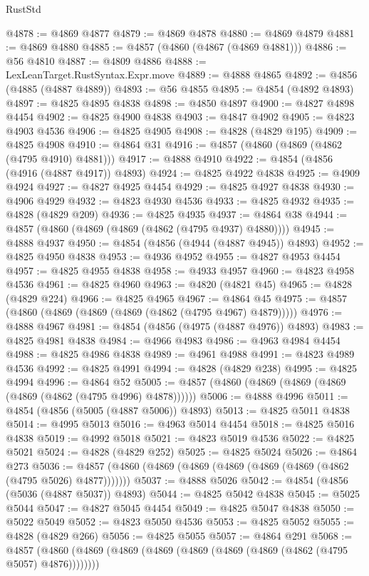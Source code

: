 \begin{lexlean}{RustStd}
\begin{coremodule}
@4878 := @4869 @4877
@4879 := @4869 @4878
@4880 := @4869 @4879
@4881 := @4869 @4880
@4885 := @4857 (@4860 (@4867 (@4869 @4881)))
@4886 := @56 @4810
@4887 := @4809 @4886
@4888 := LexLeanTarget.RustSyntax.Expr.move
@4889 := @4888 @4865
@4892 := @4856 (@4885 (@4887 @4889))
@4893 := @56 @4855
@4895 := @4854 (@4892 @4893)
@4897 := @4825 @4895 @4838
@4898 := @4850 @4897
@4900 := @4827 @4898 @4454
@4902 := @4825 @4900 @4838
@4903 := @4847 @4902
@4905 := @4823 @4903 @4536
@4906 := @4825 @4905
@4908 := @4828 (@4829 @195)
@4909 := @4825 @4908
@4910 := @4864 @31
@4916 := @4857 (@4860 (@4869 (@4862 (@4795 @4910) @4881)))
@4917 := @4888 @4910
@4922 := @4854 (@4856 (@4916 (@4887 @4917)) @4893)
@4924 := @4825 @4922 @4838
@4925 := @4909 @4924
@4927 := @4827 @4925 @4454
@4929 := @4825 @4927 @4838
@4930 := @4906 @4929
@4932 := @4823 @4930 @4536
@4933 := @4825 @4932
@4935 := @4828 (@4829 @209)
@4936 := @4825 @4935
@4937 := @4864 @38
@4944 := @4857 (@4860 (@4869 (@4869 (@4862 (@4795 @4937) @4880))))
@4945 := @4888 @4937
@4950 := @4854 (@4856 (@4944 (@4887 @4945)) @4893)
@4952 := @4825 @4950 @4838
@4953 := @4936 @4952
@4955 := @4827 @4953 @4454
@4957 := @4825 @4955 @4838
@4958 := @4933 @4957
@4960 := @4823 @4958 @4536
@4961 := @4825 @4960
@4963 := @4820 (@4821 @45)
@4965 := @4828 (@4829 @224)
@4966 := @4825 @4965
@4967 := @4864 @45
@4975 := @4857 (@4860 (@4869 (@4869 (@4869 (@4862 (@4795 @4967) @4879)))))
@4976 := @4888 @4967
@4981 := @4854 (@4856 (@4975 (@4887 @4976)) @4893)
@4983 := @4825 @4981 @4838
@4984 := @4966 @4983
@4986 := @4963 @4984 @4454
@4988 := @4825 @4986 @4838
@4989 := @4961 @4988
@4991 := @4823 @4989 @4536
@4992 := @4825 @4991
@4994 := @4828 (@4829 @238)
@4995 := @4825 @4994
@4996 := @4864 @52
@5005 := @4857 (@4860 (@4869 (@4869 (@4869 (@4869 (@4862 (@4795 @4996) @4878))))))
@5006 := @4888 @4996
@5011 := @4854 (@4856 (@5005 (@4887 @5006)) @4893)
@5013 := @4825 @5011 @4838
@5014 := @4995 @5013
@5016 := @4963 @5014 @4454
@5018 := @4825 @5016 @4838
@5019 := @4992 @5018
@5021 := @4823 @5019 @4536
@5022 := @4825 @5021
@5024 := @4828 (@4829 @252)
@5025 := @4825 @5024
@5026 := @4864 @273
@5036 := @4857 (@4860 (@4869 (@4869 (@4869 (@4869 (@4869 (@4862 (@4795 @5026) @4877)))))))
@5037 := @4888 @5026
@5042 := @4854 (@4856 (@5036 (@4887 @5037)) @4893)
@5044 := @4825 @5042 @4838
@5045 := @5025 @5044
@5047 := @4827 @5045 @4454
@5049 := @4825 @5047 @4838
@5050 := @5022 @5049
@5052 := @4823 @5050 @4536
@5053 := @4825 @5052
@5055 := @4828 (@4829 @266)
@5056 := @4825 @5055
@5057 := @4864 @291
@5068 := @4857 (@4860 (@4869 (@4869 (@4869 (@4869 (@4869 (@4869 (@4862 (@4795 @5057) @4876))))))))

\end{coremodule}
\end{lexlean}
